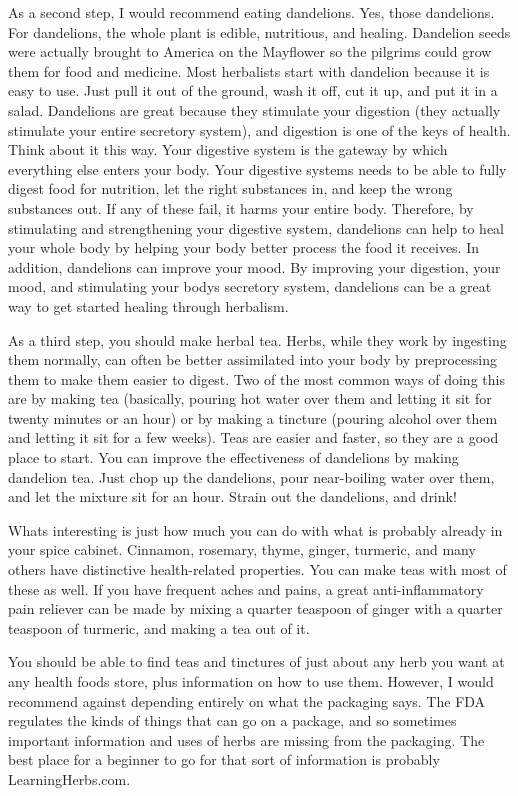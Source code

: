 As a second step, I would recommend eating dandelions. Yes, those
dandelions. For dandelions, the whole plant is edible, nutritious, and
healing.  Dandelion seeds were actually brought to America on the
Mayflower so the pilgrims could grow them for food and medicine.  Most
herbalists start with dandelion because it is easy to use. Just pull it
out of the ground, wash it off, cut it up, and put it in a salad.
Dandelions are great because they stimulate your digestion (they
actually stimulate your entire secretory system), and digestion is one
of the keys of health. Think about it this way. Your digestive system
is the gateway by which everything else enters your body. Your
digestive systems needs to be able to fully digest food for nutrition,
let the right substances in, and keep the wrong substances out. If any
of these fail, it harms your entire body. Therefore, by stimulating and
strengthening your digestive system, dandelions can help to heal your
whole body by helping your body better process the food it receives. In
addition, dandelions can improve your mood. By improving your
digestion, your mood, and stimulating your body{\textquotesingle}s
secretory system, dandelions can be a great way to get started healing
through herbalism.


As a third step, you should make herbal tea. Herbs, while they work by
ingesting them normally, can often be better assimilated into your body
by preprocessing them to make them easier to digest. Two of the most
common ways of doing this are by making tea (basically, pouring hot
water over them and letting it sit for twenty minutes or an hour) or by
making a tincture (pouring alcohol over them and letting it sit for a
few weeks). Teas are easier and faster, so they are a good place to
start. You can improve the effectiveness of dandelions by making
dandelion tea. Just chop up the dandelions, pour near-boiling water
over them, and let the mixture sit for an hour. Strain out the
dandelions, and drink!  


What{\textquotesingle}s interesting is just how much you can do with
what is probably already in your spice cabinet. Cinnamon, rosemary,
thyme, ginger, turmeric, and many others have distinctive
health-related properties. You can make teas with most of these as
well. If you have frequent aches and pains, a great anti-inflammatory
pain reliever can be made by mixing a quarter teaspoon of ginger with a
quarter teaspoon of turmeric, and making a tea out of it.


You should be able to find teas and tinctures of just about any herb
you want at any health
foods store, plus information on how to use them. However, I would
recommend against depending entirely on what the packaging says. The
FDA regulates the kinds of things that can go on a package, and so
sometimes important information and uses of herbs are missing from the
packaging. The best place for a beginner to go for that sort of
information is probably LearningHerbs.com.


